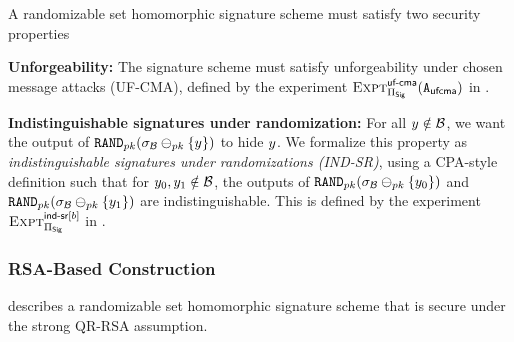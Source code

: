 %
A randomizable set homomorphic signature scheme must satisfy two security properties 

\itemListStart
\item \textbf{Unforgeability:} The signature scheme must satisfy unforgeability under chosen message attacks (UF-CMA), defined by the experiment $\Experiment{\ufcmaLabel}{\sigScheme}(\ufcmaAdversary)$ in .  
\item \textbf{Indistinguishable signatures under randomization:}  For all 
$\genericCInputElmt \notin \blocklist$, we want the output of $\randomize[\pubKey](\genericSig[\blocklist] \sigMinus[\pubKey] 
\setDefn{\genericCInputElmt})$ to hide 
$\genericCInputElmt$. We formalize this property as \emph{indistinguishable signatures under randomizations (IND-SR)}, using a CPA-style definition such that for $\genericCInputElmt{0}, \genericCInputElmt{1} \notin \blocklist$,
the outputs of $\randomize[\pubKey](\genericSig[\blocklist]
\sigMinus[\pubKey] \{\genericCInputElmt{0}\})$ and
$\randomize[\pubKey](\genericSig[\blocklist] \sigMinus[\pubKey]
\{\genericCInputElmt{1}\})$ are indistinguishable. This is defined by the experiment $\Experiment{\indsrLabel[\indBit]}{\sigScheme}$ in . 

\itemListEnd





\subsubsection{RSA-Based Construction}

 describes a  randomizable set homomorphic signature scheme that is secure under the strong QR-RSA assumption. 

